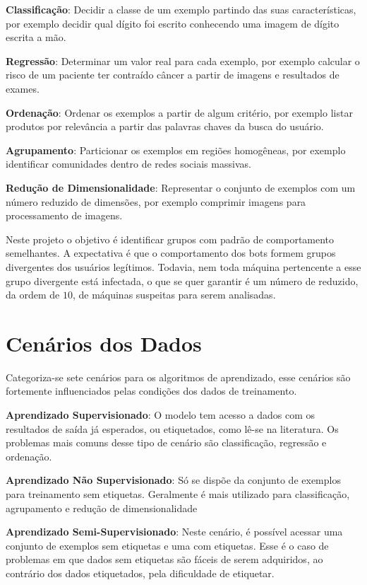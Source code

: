 \begin{description}
\item \textbf{Classificação}: Decidir a classe de um exemplo partindo das suas características, por exemplo decidir qual dígito foi escrito conhecendo uma imagem de dígito escrita a mão.
\item \textbf{Regressão}: Determinar um valor real para cada exemplo, por exemplo calcular o risco de um paciente ter contraído câncer a partir de imagens e resultados de exames.
\item \textbf{Ordenação}: Ordenar os exemplos a partir de algum critério, por exemplo listar produtos por relevância a partir das palavras chaves da busca do usuário.
\item \textbf{Agrupamento}: Particionar os exemplos em regiões homogêneas, por exemplo identificar comunidades dentro de redes sociais massivas.
\item \textbf{Redução de Dimensionalidade}: Representar o conjunto de exemplos com um número reduzido de dimensões, por exemplo comprimir imagens para processamento de imagens.
\end{description}

Neste projeto o objetivo é identificar grupos com padrão de comportamento semelhantes. A expectativa é que o comportamento dos bots formem grupos divergentes dos usuários legítimos. Todavia, nem toda máquina pertencente a esse grupo divergente está infectada, o que se quer garantir é um número de reduzido, da ordem de \(10\), de máquinas suspeitas para serem analisadas.

\section{Cenários dos Dados}

Categoriza-se \citep{mohri2012foundations} sete cenários para os algoritmos de aprendizado, esse cenários são fortemente influenciados pelas condições dos dados de treinamento.

\begin{description}
\item \textbf{Aprendizado Supervisionado}: O modelo tem acesso a dados com os resultados de saída já esperados, ou etiquetados, como lê-se na literatura. Os problemas mais comuns desse tipo de cenário são classificação, regressão e ordenação.

\item \textbf{Aprendizado Não Supervisionado}: Só se dispõe da conjunto de exemplos para treinamento sem etiquetas. Geralmente é mais utilizado para classificação, agrupamento e redução de dimensionalidade

\item \textbf{Aprendizado Semi-Supervisionado}: Neste cenário, é possível acessar uma conjunto de exemplos sem etiquetas e uma com etiquetas. Esse é o caso de problemas em que dados sem etiquetas são fáceis de serem adquiridos, ao contrário dos dados etiquetados, pela dificuldade de etiquetar.

\end{description}

